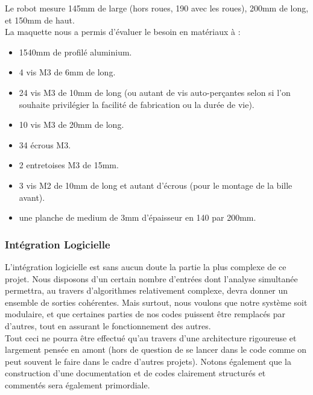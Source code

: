 			\vspace{30pt}


			Le robot mesure 145mm de large (hors roues, 190 avec les roues), 200mm de long, et 150mm de haut.\\

			La maquette nous a permis d'évaluer le besoin en matériaux à :

			\begin{itemize}
				\item 1540mm de profilé aluminium.
				\item 4 vis M3 de 6mm de long.
				\item 24 vis M3 de 10mm de long (ou autant de vis auto-perçantes selon si l'on souhaite privilégier la facilité de fabrication ou la durée de vie).
				\item 10 vis M3 de 20mm de long.
				\item 34 écrous M3.
				\item 2 entretoises M3 de 15mm.
				\item 3 vis M2 de 10mm de long et autant d'écrous (pour le montage de la bille avant).
				\item une planche de medium de 3mm d'épaisseur en 140 par 200mm.
			\end{itemize}

	\subsubsection{Intégration Logicielle}\label{integrationLogicielle}

		L'intégration logicielle est sans aucun doute la partie la plus complexe de ce projet. Nous disposons d'un certain nombre d'entrées dont l'analyse simultanée permettra, au travers d'algorithmes relativement complexe, devra donner un ensemble de sorties cohérentes. Mais surtout, nous voulons que notre système soit modulaire, et que certaines parties de nos codes puissent être remplacés par d'autres, tout en assurant le fonctionnement des autres.\\

		Tout ceci ne pourra être effectué qu'au travers d'une architecture rigoureuse et largement pensée en amont (hors de question de se lancer dans le code comme on peut souvent le faire dans le cadre d'autres projets). Notons également que la construction d'une documentation et de codes clairement structurés et commentés sera également primordiale.\\

